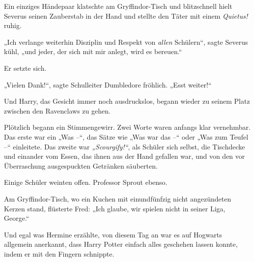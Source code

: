 Ein einziges Händepaar klatschte am Gryffindor-Tisch und blitzschnell hielt Severus seinen Zauberstab in der Hand und stellte den Täter mit einem \emph{Quietus!} ruhig. 

„Ich verlange weiterhin Disziplin und Respekt von \emph{allen} Schülern“, sagte Severus kühl, „und jeder, der sich mit mir anlegt, wird es bereuen.“ 

Er setzte sich. 

„Vielen Dank!“, sagte Schulleiter Dumbledore fröhlich. „Esst weiter!“ 

Und Harry, das Gesicht immer noch ausdruckslos, begann wieder zu seinem Platz zwischen den Ravenclaws zu gehen. 

Plötzlich begann ein Stimmengewirr. Zwei Worte waren anfangs klar vernehmbar. Das erste war ein „Was –“, das Sätze wie „Was war das –“ oder „Was zum Teufel –“ einleitete. Das zweite war \emph{„Scourgify!“}, als Schüler sich selbst, die Tischdecke und einander vom Essen, das ihnen aus der Hand gefallen war, und von den vor Überraschung ausgespuckten Getränken säuberten. 

Einige Schüler weinten offen. Professor Sprout ebenso. 

Am Gryffindor-Tisch, wo ein Kuchen mit einundfünfzig nicht angezündeten Kerzen stand, flüsterte Fred: „Ich glaube, wir spielen nicht in seiner Liga, George.“ 

Und egal was Hermine erzählte, von diesem Tag an war es auf Hogwarts allgemein anerkannt, dass Harry Potter einfach alles geschehen lassen konnte, indem er mit den Fingern schnippte.

